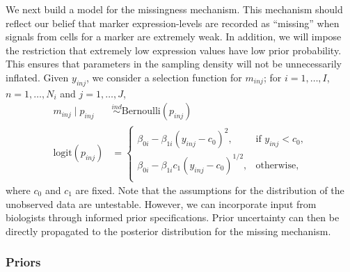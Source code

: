 \documentclass[12pt,]{article}
\newcommand{\p}[1]{\left(#1\right)}
\newcommand{\ind}{\overset{ind}{\sim}}
\def\logit{\text{logit}}
\def\Bern{\text{Bernoulli}}
\begin{document}
We next build a model for the missingness mechanism.
This mechanism should reflect our belief that marker expression-levels are
recorded as ``missing'' when signals from cells for a marker are extremely
weak.  In addition, we will impose the restriction that extremely low
expression values have low prior probability. This ensures that parameters in
the sampling density will not be unnecessarily inflated.
%
Given
\(y_{inj}\), we consider a selection function for \(m_{inj}\); for
\(i=1, \ldots, I\), \(n=1, \ldots, N_i\) and \(j=1, \ldots, J\),
\begin{align}
  m_{inj} \mid p_{inj} &\ind \Bern(p_{inj}) \nonumber \\
  \logit(p_{inj}) &= \begin{cases}
  \beta_{0i} - \beta_{1i}(y_{inj}-c_0)^2, & \text{if } y_{inj} < c_0\nonumber, \\
  \beta_{0i} - \beta_{1i}c_1\p{y_{inj}-c_0}^{1/2}, & \text{otherwise}, \nonumber \\
  \end{cases} \label{eq:missing}
\end{align}
where \(c_0\) and \(c_1\) are fixed.
Note that the assumptions for the distribution of the unobserved data are
untestable. However, we can incorporate input from biologists through informed
prior specifications. Prior uncertainty can then be directly propagated to the
posterior distribution for the missing mechanism.



\subsubsection{Priors}\label{priors}
\end{document}
